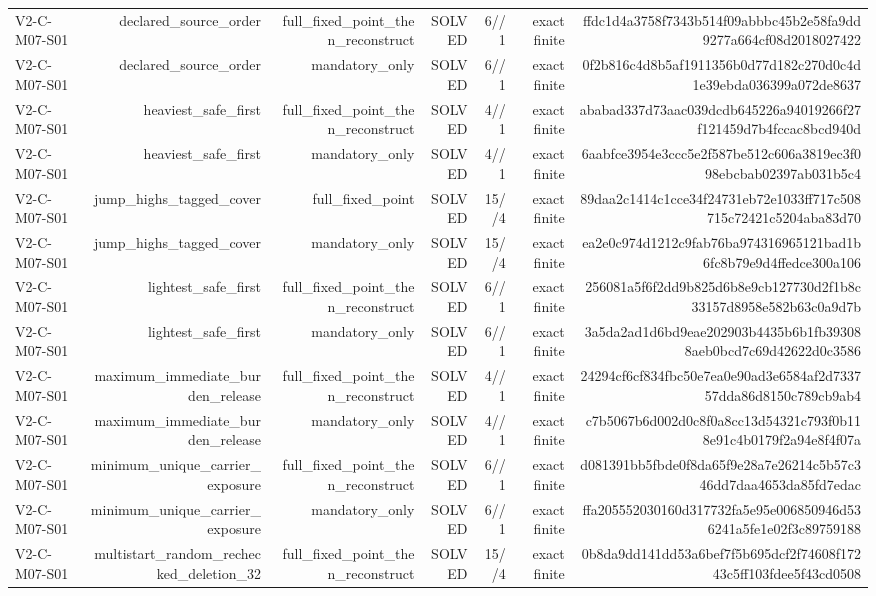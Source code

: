 {\begin{longtable}{lrrrrrr}
V2-C-M07-S01 & declared\_source\_order & full\_fixed\_point\_then\_reconstruct & SOLVED & 6//1 & exact finite & ffdc1d4a3758f7343b514f09abbbc45b2e58fa9dd9277a664cf08d2018027422 \\
V2-C-M07-S01 & declared\_source\_order & mandatory\_only & SOLVED & 6//1 & exact finite & 0f2b816c4d8b5af1911356b0d77d182c270d0c4d1e39ebda036399a072de8637 \\
V2-C-M07-S01 & heaviest\_safe\_first & full\_fixed\_point\_then\_reconstruct & SOLVED & 4//1 & exact finite & ababad337d73aac039dcdb645226a94019266f27f121459d7b4fccac8bcd940d \\
V2-C-M07-S01 & heaviest\_safe\_first & mandatory\_only & SOLVED & 4//1 & exact finite & 6aabfce3954e3ccc5e2f587be512c606a3819ec3f098ebcbab02397ab031b5c4 \\
V2-C-M07-S01 & jump\_highs\_tagged\_cover & full\_fixed\_point & SOLVED & 15//4 & exact finite & 89daa2c1414c1cce34f24731eb72e1033ff717c508715c72421c5204aba83d70 \\
V2-C-M07-S01 & jump\_highs\_tagged\_cover & mandatory\_only & SOLVED & 15//4 & exact finite & ea2e0c974d1212c9fab76ba974316965121bad1b6fc8b79e9d4ffedce300a106 \\
V2-C-M07-S01 & lightest\_safe\_first & full\_fixed\_point\_then\_reconstruct & SOLVED & 6//1 & exact finite & 256081a5f6f2dd9b825d6b8e9cb127730d2f1b8c33157d8958e582b63c0a9d7b \\
V2-C-M07-S01 & lightest\_safe\_first & mandatory\_only & SOLVED & 6//1 & exact finite & 3a5da2ad1d6bd9eae202903b4435b6b1fb393088aeb0bcd7c69d42622d0c3586 \\
V2-C-M07-S01 & maximum\_immediate\_burden\_release & full\_fixed\_point\_then\_reconstruct & SOLVED & 4//1 & exact finite & 24294cf6cf834fbc50e7ea0e90ad3e6584af2d733757dda86d8150c789cb9ab4 \\
V2-C-M07-S01 & maximum\_immediate\_burden\_release & mandatory\_only & SOLVED & 4//1 & exact finite & c7b5067b6d002d0c8f0a8cc13d54321c793f0b118e91c4b0179f2a94e8f4f07a \\
V2-C-M07-S01 & minimum\_unique\_carrier\_exposure & full\_fixed\_point\_then\_reconstruct & SOLVED & 6//1 & exact finite & d081391bb5fbde0f8da65f9e28a7e26214c5b57c346dd7daa4653da85fd7edac \\
V2-C-M07-S01 & minimum\_unique\_carrier\_exposure & mandatory\_only & SOLVED & 6//1 & exact finite & ffa205552030160d317732fa5e95e006850946d536241a5fe1e02f3c89759188 \\
V2-C-M07-S01 & multistart\_random\_rechecked\_deletion\_32 & full\_fixed\_point\_then\_reconstruct & SOLVED & 15//4 & exact finite & 0b8da9dd141dd53a6bef7f5b695dcf2f74608f17243c5ff103fdee5f43cd0508 \\

\end{longtable}}
